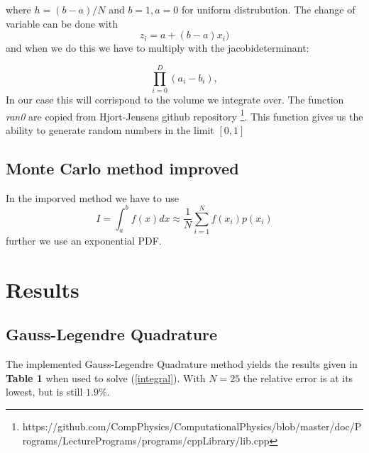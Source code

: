 \documentclass[twoside,twocolumn]{article}
\begin{document}
where $h = (b - a) / N$ and $b=1,a=0$ for uniform distrubution. The change of variable can be done with 
\begin{equation}
z_i = a + (b-a) x_i)
\end{equation}
and when we do this we have to multiply with the jacobideterminant:

\begin{equation}
 \prod\limits_{i=0}^D (a_i - b_i),
\end{equation}
In our case this will corrispond to the volume we integrate over.
The function \textit{ran0}  are copied from Hjort-Jensens github repository \footnote{https://github.com/CompPhysics/ComputationalPhysics/blob/master/doc/Programs/LecturePrograms/programs/cppLibrary/lib.cpp}. This function gives us the ability to generate random numbers in the limit $[0,1]$
\subsection{Monte Carlo method improved}

In the imporved method we have to use
\begin{equation}
I =\int_{a}^{b}f(x)dx \approx \frac{1}{N}\sum_{i=1}^{N} f(x_i)p(x_i)
\end{equation}
further we use an exponential PDF.




\section{Results}


\subsection{Gauss-Legendre Quadrature}
The implemented Gauss-Legendre Quadrature method yields the results given in \textbf{Table 1} when used to solve (\ref{integral}). With $N=25$ the relative error is at its lowest, but is still $1.9 \%$. 
\end{document}

